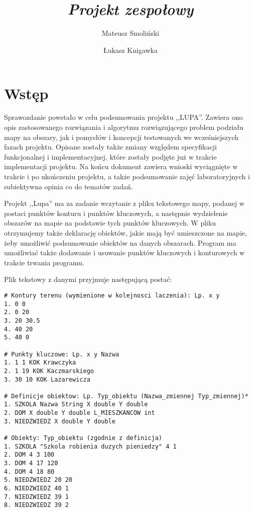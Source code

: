 \documentclass[a4paper,12pt]{article}
\title{ \sc{Sprawozdanie końcowe} \\
\emph{Projekt zespołowy}}
\author{Mateusz Smoliński \and Łukasz Knigawka}
\newcommand\tab[1][0.6cm]{\hspace*{#1}}
\begin{document}
\maketitle
\thispagestyle{empty}

\tableofcontents

\newpage

\section{Wstęp}

\tab Sprawozdanie powstało w celu podsumowania projektu ,,LUPA''. Zawiera ono opis zastosowanego rozwiązania i algorytmu rozwiązującego problem podziału mapy na obszary, jak i pomysłów i koncepcji testowanych we wcześniejszych fazach projektu. Opisane zostały także zmiany względem specyfikacji funkcjonalnej i implementacyjnej, które zostały podjęte już w trakcie implementacji projektu. Na końcu dokument zawiera wnioski wyciągnięte w trakcie i po ukończeniu projektu, a także podsumowanie zajęć laboratoryjnych i subiektywna opinia co do tematów zadań.

Projekt ,,Lupa'' ma za zadanie wczytanie z pliku tekstowego mapy, podanej w postaci punktów konturu i punktów kluczowych, a następnie wydzielenie obszarów na mapie na podstawie tych punktów kluczowych. W pliku otrzymujemy także deklarację obiektów, jakie mają być umieszczone na mapie, żeby umożliwić podsumowanie obiektów na danych obszarach. Program ma umożliwiać także dodawanie i usuwanie punktów kluczowych i konturowych w trakcie trwania programu.

Plik tekstowy z danymi przyjmuje następującą postać: 

\begin{lstlisting}
# Kontury terenu (wymienione w kolejnosci laczenia): Lp. x y
1. 0 0
2. 0 20
3. 20 30.5
4. 40 20
5. 40 0

# Punkty kluczowe: Lp. x y Nazwa
1. 1 1 KOK Krawczyka
2. 1 19 KOK Kaczmarskiego
3. 30 10 KOK Lazarewicza

# Definicje obiektow: Lp. Typ_obiektu (Nazwa_zmiennej Typ_zmiennej)*
1. SZKOLA Nazwa String X double Y double
2. DOM X double Y double L_MIESZKANCOW int
3. NIEDZWIEDZ X double Y double

# Obiekty: Typ_obiektu (zgodnie z definicja)
1. SZKOLA "Szkola robienia duzych pieniedzy" 4 1
2. DOM 4 3 100
3. DOM 4 17 120
4. DOM 4 18 80
5. NIEDZWIEDZ 20 20
6. NIEDZWIEDZ 40 1
7. NIEDZWIEDZ 39 1
8. NIEDZWIEDZ 39 2
\end{lstlisting}
\end{document}
